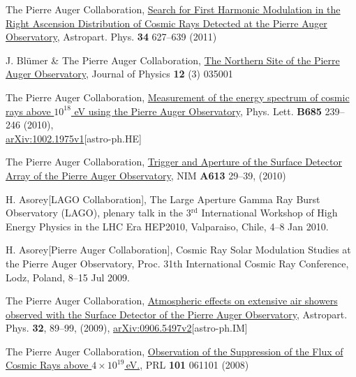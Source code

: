 \begin{etaremune}
\item {}The Pierre Auger Collaboration,
\href{http://dx.doi.org/10.1016/j.astropartphys.2010.12.007}{{Search for
First Harmonic Modulation in the Right Ascension Distribution of Cosmic Rays
Detected at the Pierre Auger Observatory}}, Astropart. Phys. {\bf 34} 627--639
(2011)

\item {}J. Bl\"umer \& The Pierre Auger Collaboration,
\href{http://dx.doi.org/10.1088/1367-2630/12/3/035001}{{The Northern Site
of the Pierre Auger Observatory}}, Journal of Physics {\bf 12} (3) 035001

\item {}The Pierre Auger Collaboration,
\href{http://dx.doi.org/10.1016/j.physletb.2010.02.013}{{Measurement of
the energy spectrum of cosmic rays above $10^{18}$ eV using the Pierre Auger
Observatory}}, Phys. Lett. {\bf B685} 239--246 (2010),\\
\href{http://arxiv.org/abs/1002.1975}{arXiv:1002.1975v1}[astro-ph.HE]

\item {}The Pierre Auger Collaboration,
\href{http://dx.doi.org/10.1016/j.nima.2009.11.018}{{Trigger and Aperture
of the Surface Detector Array of the Pierre Auger Observatory}}, NIM {\bf A613}
29--39, (2010)

\item {}H. Asorey[LAGO Collaboration], {{The Large Aperture Gamma Ray
Burst Observatory (LAGO)}}, plenary talk in the 3$^{\mathrm{rd}}$ International Workshop of
High Energy Physics in the LHC Era HEP2010, Valparaiso, Chile, 4--8 Jan 2010.

\item {}H. Asorey[Pierre Auger Collaboration], {{Cosmic Ray Solar
Modulation Studies at the Pierre Auger Observatory}}, \en Proc. 31th
International Cosmic Ray Conference, Lodz, Poland, 8--15 Jul 2009.

\item {} The Pierre Auger Collaboration,
\href{http://dx.doi.org/10.1016/j.astropartphys.2009.06.004}{{Atmospheric
effects on extensive air showers observed with the Surface Detector of the
Pierre Auger Observatory}}, Astropart. Phys. {\bf 32}, 89--99, (2009),
\href{http://arxiv.org/abs/0906.5497/}{arXiv:0906.5497v2}[astro-ph.IM]

\item {}The Pierre Auger Collaboration,
\href{http://dx.doi.org/10.1103/PhysRevLett.101.061101}{{Observation of
the Suppression of the Flux of Cosmic Rays above $4\times10^{19}$\,eV.}}, PRL
{\bf 101} 061101 (2008)


\end{etaremune}
